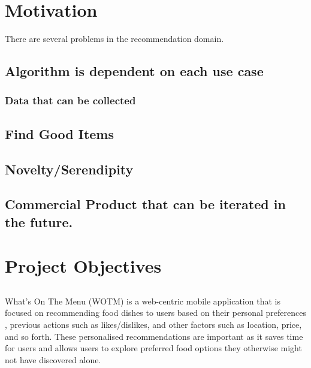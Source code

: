 \section{Motivation}

There are several problems in the recommendation domain. 

\subsection{Algorithm is dependent on each use case}
\subsubsection{Data that can be collected}
\subsection{Find Good Items}
\subsection{Novelty/Serendipity}
\subsection{Commercial Product that can be iterated in the future.}
\section{Project Objectives}
\subsection{}
\subsection{}
\subsection{}
\subsection{}


What’s On The Menu (WOTM) is a web-centric mobile application that is focused on recommending food dishes to users based on their personal preferences , previous actions such as likes/dislikes, and other factors such as location, price, and so forth. These personalised recommendations are important as it saves time for users and allows users to explore preferred food options they otherwise might not have discovered alone. 

